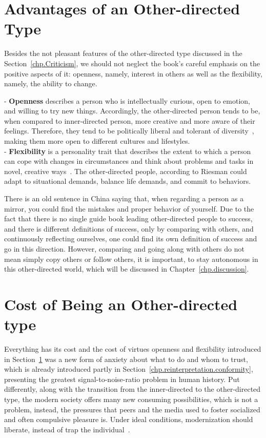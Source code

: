 \section{Advantages of an Other-directed Type}\label{chp.reinterpretation.advantage}

Besides the not pleasant features of the other-directed type discussed in the Section~\ref{chp.Criticism}, we should not neglect the book’s careful emphasis on the positive aspects of it: openness, namely, interest in others as well as the flexibility, namely, the ability to change. 

\noindent - \textbf{Openness} describes a person who is intellectually curious, open to emotion, and willing to try new things. Accordingly, the other-directed person tends to be, when compared to inner-directed person, more creative and more aware of their feelings. Therefore, they tend to be politically liberal and tolerant of diversity~\citep{mccrae1996social,jost2006end}, making them more open to different cultures and lifestyles.\\  
\noindent - \textbf{Flexibility} is a personality trait that describes the extent to which a person can cope with changes in circumstances and think about problems and tasks in novel, creative ways~\citep{thurston1999flexibility}. The other-directed people, according to Riesman could adapt to situational demands, balance life demands, and commit to behaviors.
			
There is an old sentence in China saying that, when regarding a person as a mirror, you could find the mistakes and proper behavior of yourself. Due to the fact that there is no single guide book leading other-directed people to success, and there is different definitions of success, only by comparing with others, and continuously reflecting ourselves, one could find its own definition of success and go in this direction. However, comparing and going along with others do not mean simply copy others or follow others, it is important, to stay autonomous in this other-directed world, which will be discussed in Chapter~\ref{chp.discussion}.

\section{Cost of Being an Other-directed type}\label{chp.reinterpretation.cost}

Everything has its cost and the cost of virtues openness and flexibility introduced in Section~\ref{chp.reinterpretation.advantage} was a new form of anxiety about what to do and whom to trust, which is already introduced partly in Section~\ref{chp.reinterpretation.conformity}, presenting the greatest signal-to-noise-ratio problem in human history. Put differently, along with the transition from the inner-directed to the other-directed type, the modern society offers many new consuming possibilities, which is not a problem, instead, the pressures that peers and the
media used to foster socialized and often compulsive pleasure is. Under ideal conditions, modernization should liberate, instead of trap the individual~\citep{horowitz2010david}.  
			
